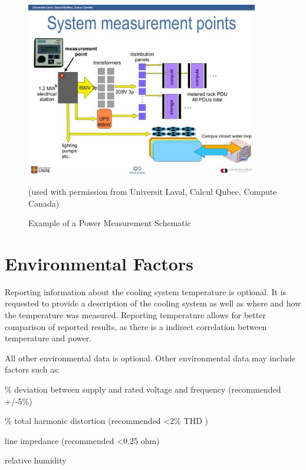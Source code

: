 \begin{figure}
\centering
\includegraphics[width=4in]{fig3-7}
\caption{Example of a Power Measurement Schematic}
(used with permission from Universit Laval, Calcul Qubec, Compute Canada)
\label{fig:powmeasschem}
\end{figure}


\section{Environmental Factors}
\label{sec:EF}
\noindent
Reporting information about the cooling system temperature is optional.
It is requested to provide a description of the cooling system as well as where and how the temperature was measured.
Reporting temperature allows for better comparison of reported results, as there is a indirect correlation between temperature and power.

\wl

\noindent
All other environmental data is optional. 
Other environmental data may include factors such as:

\begin{packed_item}
\item[{-}]
\% deviation between supply and rated voltage and frequency (recommended +/-5\%)
\item[{-}]
\% total harmonic distortion (recommended \textless 2\% THD )
\item[{-}]
line impedance (recommended \textless 0.25 ohm)
\item[{-}]
relative humidity
\end{packed_item}

